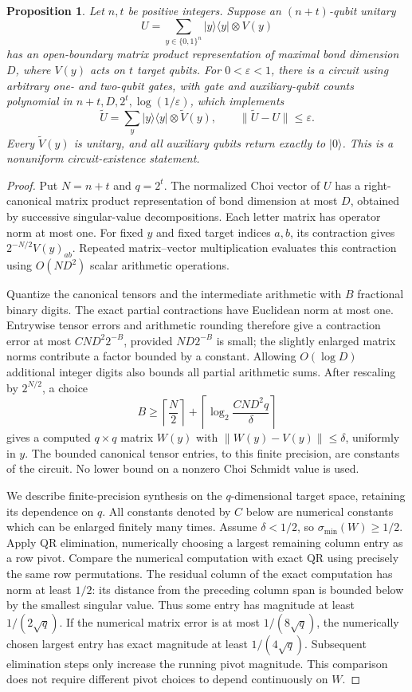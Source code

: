 \documentclass[11pt]{article}
\newtheorem{proposition}{Proposition}
\begin{document}
\begin{proposition}\label{prop:controlled-approx}
Let $n,t$ be positive integers. Suppose an $(n+t)$-qubit unitary
\[
 U=\sum_{y\in\{0,1\}^n}|y\rangle\langle y|\otimes V(y)
\]
has an open-boundary matrix product representation of maximal bond
dimension $D$, where $V(y)$ acts on $t$ target qubits.
For $0<\varepsilon<1$, there is a circuit using arbitrary one- and
two-qubit gates, with gate and auxiliary-qubit counts polynomial in
$n+t,D,2^t,\log(1/\varepsilon)$, which implements
\[
 \widetilde U=\sum_y|y\rangle\langle y|\otimes\widetilde V(y),
 \qquad \|\widetilde U-U\|\leq\varepsilon.
\]
Every $\widetilde V(y)$ is unitary, and all auxiliary qubits return
exactly to $|0\rangle$.
This is a nonuniform circuit-existence statement.
\end{proposition}
\begin{proof}
Put $N=n+t$ and $q=2^t$. The normalized Choi vector of $U$ has a
right-canonical matrix product representation of bond dimension at
most $D$, obtained by successive singular-value decompositions.
Each letter matrix has operator norm at most one. For fixed
$y$ and fixed target indices $a,b$, its contraction gives
$2^{-N/2}V(y)_{ab}$. Repeated matrix--vector multiplication evaluates
this contraction using $O(ND^2)$ scalar arithmetic operations.

Quantize the canonical tensors and the intermediate arithmetic with
$B$ fractional binary digits. The exact partial contractions have
Euclidean norm at most one. Entrywise tensor errors and arithmetic
rounding therefore give a contraction error at most
$CND^2 2^{-B}$, provided $ND2^{-B}$ is small; the slightly enlarged
matrix norms contribute a factor bounded by a constant.
Allowing $O(\log D)$ additional integer digits also bounds all partial
arithmetic sums. After rescaling by $2^{N/2}$, a choice
\[
 B\geq \left\lceil\frac N2\right\rceil+
       \left\lceil\log_2\frac{CND^2q}{\delta}\right\rceil
\]
gives a computed $q\times q$ matrix $W(y)$ with
$\|W(y)-V(y)\|\leq\delta$, uniformly in $y$.
The bounded canonical tensor entries, to this finite precision, are
constants of the circuit. No lower bound on a nonzero Choi Schmidt
value is used.

We describe finite-precision synthesis on the $q$-dimensional target
space, retaining its dependence on $q$. All constants denoted by $C$
below are numerical constants which can be enlarged finitely many
times. Assume $\delta<1/2$, so $\sigma_{\min}(W)\geq1/2$.
Apply QR elimination, numerically choosing a largest remaining
column entry as a row pivot. Compare the numerical computation with
exact QR using precisely the same row permutations. The residual
column of the exact computation has norm at least $1/2$: its
distance from the preceding column span is bounded below by the
smallest singular value. Thus some entry has magnitude at least
$1/(2\sqrt q)$. If the numerical matrix error is at most
$1/(8\sqrt q)$, the numerically chosen largest entry has exact
magnitude at least $1/(4\sqrt q)$. Subsequent elimination steps
only increase the running pivot magnitude. This comparison does
not require different pivot choices to depend continuously on $W$.


\end{proof}
\end{document}
